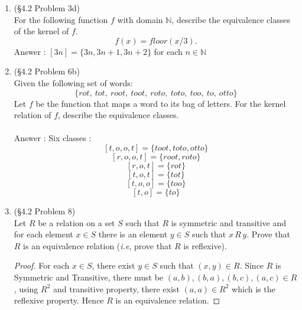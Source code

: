 \documentclass[12pt]{article}
\newcommand{\NN}{\mathbb{N}}
\begin{document}
\begin{enumerate}
\begin{proof}
\end{proof}












\item (\S4.2 Problem 3d)\\
For the following function $f$ with domain $\NN$, describe the equivalence classes of the kernel of $f$.
\[f(x)=floor(x/3).\]
Answer : $[3n] = \{3n,3n+1,3n+2\}$ for each $n \in \NN$












\item (\S4.2 Problem 6b)\\
Given the following set of words:
\[\{rot,\ tot,\ root,\ toot,\ roto,\ toto,\ too,\ to,\ otto\}\]
Let $f$ be the function that maps a word to its bag of letters. For the kernel relation of $f$, describe the equivalence classes. \\
\\
Answer : Six classes :\\
\[[t,o,o,t]=\{toot,toto,otto\}\]
\[[r,o,o,t]=\{root, roto\}\]
\[[r,o,t]=\{rot\}\]
\[[t,o,t]=\{tot\}\]
\[[t,o,o]=\{too\}\]
\[[t,o]=\{to\}\]












\item (\S4.2 Problem 8)\\
Let $R$ be a relation on a set $S$ such that $R$ is symmetric and transitive and for each element $x\in S$ there is an element $y\in S$ such that $x\, R\, y$. Prove that $R$ is an equivalence relation (\emph{i.e}, prove that $R$ is reflexive).
\begin{proof}
For each $x\in S$, there exist $y \in S$ such that $(x,y) \in R$. Since $R$ is Symmetric and Transitive, there must be $(a,b),(b,a),(b,c),(a,c) \in R$, using $R^2$ and transitive property, there exist $(a,a) \in R^2$ which is the reflexive property. Hence $R$ is an equivalence relation.


\end{proof}
\end{enumerate}
\end{document}
